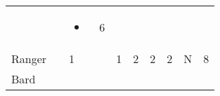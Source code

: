 \documentclass[12pt]{article}
\newcommand{\indexClass}[1]{\index{#1}}
\newcommand{\class}[1]{#1\indexClass{#1}}
\begin{document}
\begin{longtable}[]{@{}llllllllll@{}}
\begin{minipage}[t]{0.06\columnwidth}\raggedright\strut
\strut\end{minipage} &
\begin{minipage}[t]{0.06\columnwidth}\raggedright\strut
\strut\end{minipage} &
\begin{minipage}[t]{0.07\columnwidth}\raggedright\strut
\begin{itemize}
\item
\end{itemize}
\strut\end{minipage} &
\begin{minipage}[t]{0.08\columnwidth}\raggedright\strut
6
\strut\end{minipage}\tabularnewline
\begin{minipage}[t]{0.13\columnwidth}\raggedright\strut
\class{Ranger}
\strut\end{minipage} &
\begin{minipage}[t]{0.06\columnwidth}\raggedright\strut
\strut\end{minipage} &
\begin{minipage}[t]{0.06\columnwidth}\raggedright\strut
1
\strut\end{minipage} &
\begin{minipage}[t]{0.06\columnwidth}\raggedright\strut
\strut\end{minipage} &
\begin{minipage}[t]{0.06\columnwidth}\raggedright\strut
1
\strut\end{minipage} &
\begin{minipage}[t]{0.06\columnwidth}\raggedright\strut
2
\strut\end{minipage} &
\begin{minipage}[t]{0.06\columnwidth}\raggedright\strut
2
\strut\end{minipage} &
\begin{minipage}[t]{0.06\columnwidth}\raggedright\strut
2
\strut\end{minipage} &
\begin{minipage}[t]{0.07\columnwidth}\raggedright\strut
N
\strut\end{minipage} &
\begin{minipage}[t]{0.08\columnwidth}\raggedright\strut
8
\strut\end{minipage}\tabularnewline
\begin{minipage}[t]{0.13\columnwidth}\raggedright\strut
\class{Bard}
\strut\end{minipage} &

\end{longtable}
\end{document}
